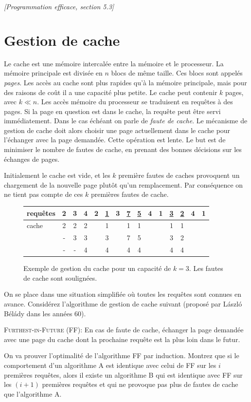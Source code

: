 \documentclass[12pt]{article}
\newcommand{\source}[1]{\begin{flushright}\emph{[#1]}\end{flushright}}
\begin{document}
\source{Programmation efficace, section 5.3}


\section{Gestion de cache}

Le cache est une mémoire intercalée entre la mémoire et le processeur.
La mémoire principale est divisée en $n$ blocs de même taille.  Ces blocs sont appelés \emph{pages}.
Les accès au cache sont plus rapides qu'à la mémoire principale,
mais pour des raisons de coût il a une capacité plus petite.  Le cache peut contenir $k$ pages, avec $k \ll n$.
Les accès mémoire du processeur se traduisent en requêtes à des pages. Si la page en question est dans le cache, la requête peut être servi immédiatement. Dans le cas échéant on parle de \emph{faute de cache}. Le mécanisme de gestion de cache doit alors choisir une page actuellement dans le cache pour l'échanger avec la page demandée.  Cette opération est lente.  Le but est de minimiser le nombre de fautes de cache, en prenant des bonnes décisions sur les échanges de pages.

Initialement le cache est vide, et les $k$ première fautes de caches provoquent un chargement de la nouvelle page plutôt qu'un remplacement.  Par conséquence on ne tient pas compte de ces $k$ premières fautes de cache.


\begin{figure}[hp]
\begin{center}
\begin{tabular}{l||*{14}c}
requêtes &
2 & 3 & 4 & 2 & \underline{1} & 3 & \underline{7} & \underline{5} & 4 & 1 & \underline{3} & \underline{2} & 4 & 1
\\ \hline
cache
& 2 & 2 & 2 & & 1 & & 1 & 1 & & & 1 & 1 \\
& - & 3 & 3 & & 3 & & 7 & 5 & & & 3 & 2 \\
& - & - & 4 & & 4 & & 4 & 4 & & & 4 & 4 \\
\end{tabular}
\end{center}
\caption{Exemple de gestion du cache pour un capacité de $k=3$. Les fautes de cache sont soulignées.}
\end{figure}

On se place dans une situation simplifiée où toutes les requêtes sont connues en avance.
Considérez l'algorithme de gestion de cache suivant (proposé par László Bélády dans les années 60).

\begin{framed}
    \textsc{Furthest-in-Future} (FF): En cas de faute de cache, échanger la page demandée avec une page du cache dont la prochaine requête est la plus loin dans le futur.
\end{framed}

On va prouver l'optimalité de l'algorithme FF par induction.
Montrez que si le comportement d'un algorithme A est identique avec celui de FF sur les $i$ premières requêtes, alors il existe un algorithme B qui est identique avec FF sur les $(i+1)$ premières requêtes et qui ne provoque pas plus de fautes de cache que l'algorithme A.
\end{document}
